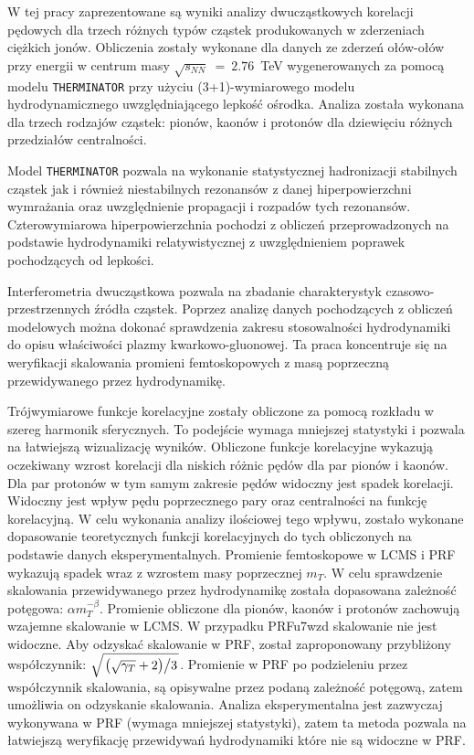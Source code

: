 W tej pracy zaprezentowane są wyniki analizy dwucząstkowych korelacji pędowych dla trzech różnych typów cząstek produkowanych w zderzeniach ciężkich jonów.
Obliczenia zostały wykonane dla danych ze zderzeń ołów-ołów przy energii w centrum masy $\sqrt{s_{NN}}~=~2.76$~TeV wygenerowanych za pomocą modelu \verb|THERMINATOR| przy użyciu (3+1)-wymiarowego modelu hydrodynamicznego uwzględniającego lepkość ośrodka.
Analiza została wykonana dla trzech rodzajów cząstek: pionów, kaonów i protonów dla dziewięciu różnych przedziałów centralności.

Model \verb|THERMINATOR| pozwala na wykonanie statystycznej hadronizacji stabilnych cząstek jak i również niestabilnych rezonansów z danej hiperpowierzchni wymrażania oraz uwzględnienie propagacji i rozpadów tych rezonansów.
Czterowymiarowa hiperpowierzchnia pochodzi z obliczeń przeprowadzonych na podstawie hydrodynamiki relatywistycznej z uwzględnieniem poprawek pochodzących od lepkości.

Interferometria dwucząstkowa pozwala na zbadanie charakterystyk czasowo-przestrzennych źródła cząstek.
Poprzez analizę danych pochodzących z obliczeń modelowych można dokonać sprawdzenia zakresu stosowalności hydrodynamiki do opisu właściwości plazmy kwarkowo-gluonowej.
Ta praca koncentruje się na weryfikacji skalowania promieni femtoskopowych z masą poprzeczną przewidywanego przez hydrodynamikę.

Trójwymiarowe funkcje korelacyjne zostały obliczone za pomocą rozkładu w szereg harmonik sferycznych.
To podejście wymaga mniejszej statystyki i pozwala na łatwiejszą wizualizację wyników.
Obliczone funkcje korelacyjne wykazują oczekiwany wzrost korelacji dla niskich różnic pędów dla par pionów i kaonów.
Dla par protonów w tym samym zakresie pędów widoczny jest spadek korelacji.
Widoczny jest wpływ pędu poprzecznego pary oraz centralności na funkcję korelacyjną.
W celu wykonania analizy ilościowej tego wpływu, zostało wykonane dopasowanie teoretycznych funkcji korelacyjnych do tych obliczonych na podstawie danych eksperymentalnych.
Promienie femtoskopowe w LCMS i PRF wykazują spadek wraz z wzrostem masy poprzecznej $m_T$.
W celu sprawdzenie skalowania przewidywanego przez hydrodynamikę została dopasowana zależność potęgowa: $\alpha m_T^{-\beta}$.
Promienie obliczone dla pionów, kaonów i protonów zachowują wzajemne skalowanie w LCMS.
W przypadku PRFu7wzd skalowanie nie jest widoczne.
Aby odzyskać skalowanie w PRF, został zaproponowany przybliżony współczynnik: $\sqrt{ \left. \left( \sqrt{\gamma_T} + 2 \right) \middle/ 3 \right. }$.
Promienie w PRF po podzieleniu przez współczynnik skalowania, są opisywalne przez podaną zależność potęgową, zatem umożliwia on odzyskanie skalowania.
Analiza eksperymentalna jest zazwyczaj wykonywana w PRF (wymaga mniejszej statystyki), zatem ta metoda pozwala na łatwiejszą weryfikację przewidywań hydrodynamiki które nie są widoczne w PRF.